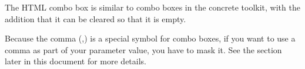
The HTML combo box is similar to combo boxes in the concrete toolkit, with the addition that it can be cleared so that it is empty. 

Because the comma (,) is a special symbol for combo boxes, if you want to use a comma as part of your parameter value, you have to mask it. See the section later in this document  for more details. 
